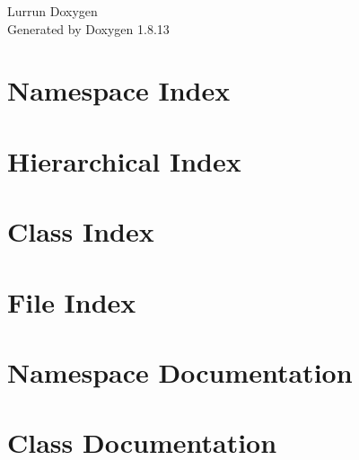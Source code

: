 \documentclass[twoside]{book}
\newcommand{\+}{\discretionary{\mbox{\scriptsize$\hookleftarrow$}}{}{}}
\newcommand{\clearemptydoublepage}{%
  \newpage{\pagestyle{empty}\cleardoublepage}%
}
\begin{document}
\hypersetup{pageanchor=false,
             bookmarksnumbered=true,
             pdfencoding=unicode
            }
\begin{titlepage}
\vspace*{7cm}
\begin{center}%
{\Large Lurrun Doxygen }\\
\vspace*{1cm}
{\large Generated by Doxygen 1.8.13}\\
\end{center}
\end{titlepage}
\clearemptydoublepage
{}
\tableofcontents
\clearemptydoublepage
{}
\hypersetup{pageanchor=true}

\chapter{Namespace Index}

\chapter{Hierarchical Index}

\chapter{Class Index}

\chapter{File Index}

\chapter{Namespace Documentation}








\chapter{Class Documentation}
















\end{document}
